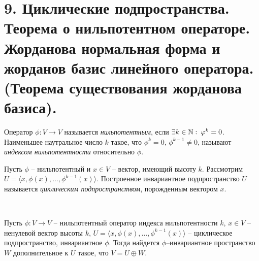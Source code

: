 \section{9. Циклические подпространства. Теорема о нильпотентном операторе. Жорданова нормальная форма и жорданов базис линейного оператора. (Теорема существования жорданова базиса).}

\begin{definition}
    Оператор $\phi: V \to V$ называется \textit{нильпотентным}, если $\exists k \in \mathbb{N} :\: \varphi^k = 0$. Наименьшее наутральное число $k$ такое, что $\phi^k = 0$, $\phi^{k-1} \neq 0$, называют \textit{индексом нильпотентности} относительно $\phi$. 
\end{definition}

\begin{definition}
    Пусть $\phi$ -- нильпотентный и $x \in V$ -- вектор, имеющий высоту $k$. 
    Рассмотрим $U = \langle x, \phi(x), \ldots, \phi^{k-1}(x)\rangle$.
    Построенное инвариантное подпространство $U$ называется \textit{циклическим подпространством}, 
    порожденным вектором $x$.
\end{definition}

\begin{theorem}~
    \label{th5.3}

    Пусть $\phi: V \to V$ -- нильпотентный оператор индекса нильпотентности $k$, $x \in V$ -- ненулевой вектор высоты $k$,
    $U = \langle x, \phi(x), \ldots, \phi^{k-1}(x) \rangle$ -- циклическое подпространство, инвариантное $\phi$.
    Тогда найдется $\phi$--инвариантное пространство $W$ дополнительное к $U$ такое, что $V = U \oplus W$.
\end{theorem}

